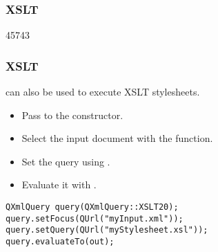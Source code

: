\label{xslt}
\subsubsection{XSLT}

\begin{slide}[fragile]{45743}\frametitle{XSLT}\label{xslt-qt}
 can also be used to execute XSLT stylesheets.
\begin{itemize}
\item Pass  to the  constructor.
\item Select the input document with the  function.
\item Set the query using .
\item Evaluate it with .
\end{itemize}
\small
\begin{verbatim}
QXmlQuery query(QXmlQuery::XSLT20);
query.setFocus(QUrl("myInput.xml"));
query.setQuery(QUrl("myStylesheet.xsl"));
query.evaluateTo(out);
\end{verbatim}
\normalsize
\end{slide}
